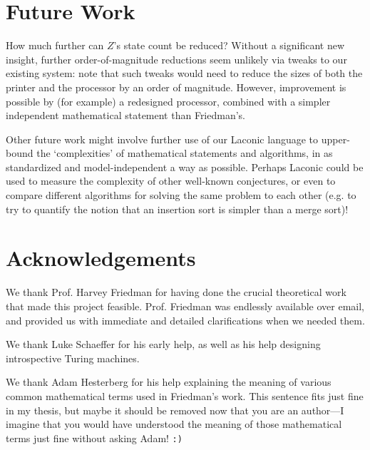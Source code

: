\documentclass[11pt]{article}
\begin{document}
\section{Future Work}

How much further can $Z$'s state count be reduced? Without a significant new insight, further order-of-magnitude reductions seem unlikely via tweaks to our existing system: note that such tweaks would need to reduce the sizes of both the printer and the processor by an order of magnitude. However, improvement is possible by (for example) a redesigned processor, combined with a simpler independent mathematical statement than Friedman's. 

Other future work might involve further use of our Laconic language to upper-bound the `complexities' of mathematical statements and algorithms, in as standardized and model-independent a way as possible. Perhaps Laconic could be used to measure the complexity of other well-known conjectures, or even to compare different algorithms for solving the same problem to each other (e.g. to try to quantify the notion that an insertion sort is simpler than a merge sort)!

\section{Acknowledgements}


We thank Prof. Harvey Friedman for having done the crucial theoretical work that made this project feasible. Prof. Friedman was endlessly available over email, and provided us with immediate and detailed clarifications when we needed them.

We thank Luke Schaeffer for his early help, as well as his help designing introspective Turing machines. 

We thank Adam Hesterberg for his help explaining the meaning of various common mathematical terms used in Friedman's work. {\color{red} This sentence fits just fine in my thesis, but maybe it should be removed now that you are an author---I imagine that you would have understood the meaning of those mathematical terms just fine without asking Adam! \texttt{:)}} 
\end{document}
